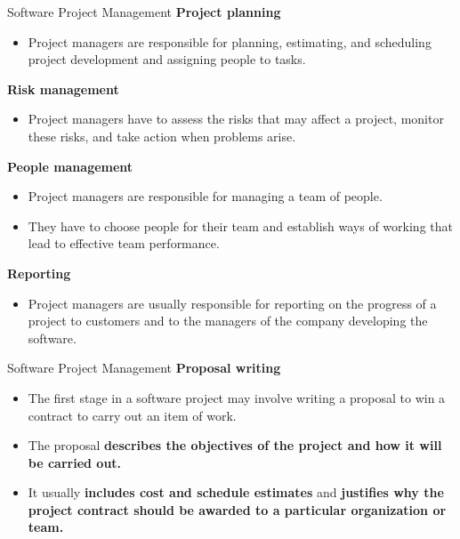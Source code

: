 \documentclass{beamer}
\begin{document}
\begin{frame}{Software Project Management}
	\textbf{Project planning }
	\begin{itemize}
		\item Project managers are responsible for planning, estimating, and 
		scheduling project development and assigning people to tasks.
	\end{itemize}
	\textbf{Risk management}
	\begin{itemize}
		\item Project managers have to assess the risks that may affect a 
		project, monitor these risks, and take action when problems arise.
	\end{itemize}
\textbf{People management}
\begin{itemize}
	\item Project managers are responsible for managing a team of 
	people.
	\item They have to choose people for their team and establish ways of working that lead to effective team performance.
\end{itemize}
\textbf{Reporting}
\begin{itemize}
	\item Project managers are usually responsible for reporting on the progress 
	of a project to customers and to the managers of the company developing the 
	software.
\end{itemize}
\end{frame}
\begin{frame}{Software Project Management}
	\textbf{Proposal writing}
	\begin{itemize}
		\item The first stage in a software project may involve writing a 
		proposal to win a contract to carry out an item of work.
		\item The proposal \textbf{describes the 
			objectives of the project and how it will be carried out.}
		\item It usually \textbf{includes cost and schedule estimates} and \textbf{justifies why the project contract should be awarded to a particular organization or team.}
	\end{itemize}
\end{frame}
\end{document}
